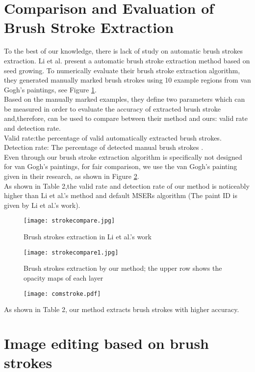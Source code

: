 \section{Comparison and Evaluation of Brush Stroke Extraction} \label{comparevan}
To the best of our knowledge, there is lack of study on automatic brush strokes extraction. Li et al.\cite{li2012rhythmic} present a automatic brush stroke extraction method based on seed growing. To numerically evaluate their brush stroke extraction algorithm, they generated manually marked brush strokes using 10 example regions from van Gogh's paintings, see Figure \ref{liswork}. \\ 
Based on the manually marked examples, they define two parameters which can be measured in order to evaluate the accuracy of extracted brush stroke and,therefore, can be used to compare between their method and ours: valid rate and detection rate.\\
Valid rate:the percentage of valid automatically extracted brush strokes. \\ Detection rate: The percentage of detected manual brush strokes . \\
Even through our brush stroke extraction algorithm is specifically not designed for van Gogh's paintings, for fair comparison, we use the van Gogh's painting given in their research, as shown in Figure \ref{vanourwork}.\\
As shown in Table 2,the valid rate and detection rate of our method is noticeably higher than Li et al.'s method \cite{li2012rhythmic} and default MSERs algorithm (The paint ID is given by Li et al.'s work). 
\begin{figure}[H]
	\texttt{[image: strokecompare.jpg]}
	\caption{Brush strokes extraction in Li et al.'s work}
	\label{liswork}
\end{figure}
\begin{figure}[H]
	\texttt{[image: strokecompare1.jpg]}
	\caption{Brush strokes extraction by our method; the upper row shows the opacity maps of each layer}
	\label{vanourwork}
\end{figure}


\begin{figure}[H]
	\texttt{[image: comstroke.pdf]}
	\label{table2}
\end{figure}
As shown in Table 2, our method extracts brush strokes with higher accuracy.





\section{Image editing based on brush strokes}\label{editing}

